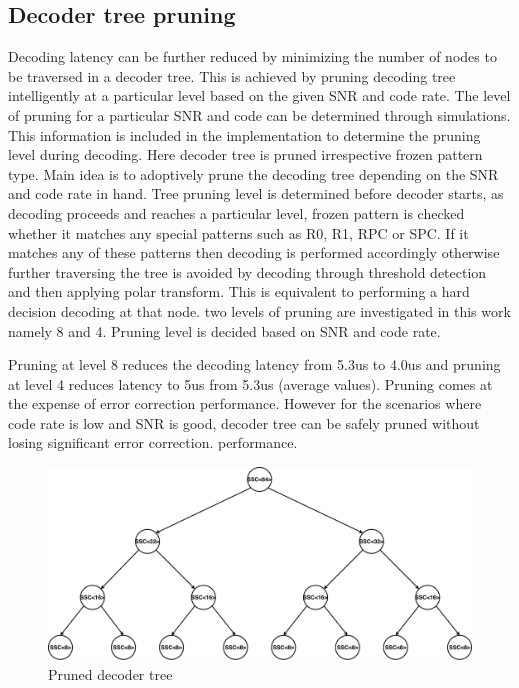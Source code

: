 \subsection{Decoder tree pruning}
Decoding latency can be further reduced by minimizing the number of nodes to be traversed in a decoder tree. This is achieved by pruning decoding tree intelligently at a particular level based on the given SNR and code rate. The level of pruning for a particular SNR and code can be determined through simulations. This information is included in the implementation to determine the pruning level during decoding. Here decoder tree is pruned irrespective frozen pattern type. Main idea is to adoptively prune the decoding tree depending on the SNR and code rate in hand. Tree pruning level is determined before decoder starts, as decoding proceeds and reaches a particular level, frozen pattern is checked whether it matches any special patterns such as R0, R1, RPC or SPC. If it matches any of these patterns then decoding is performed accordingly otherwise further traversing the tree is avoided by decoding through threshold detection and then applying polar transform. This is equivalent to performing a hard decision decoding at that node. two levels of pruning are investigated in this work namely 8 and 4. Pruning level is decided based on SNR and code rate.

Pruning at level 8 reduces the decoding latency from 5.3us to 4.0us and pruning at level 4 reduces latency to 5us from 5.3us (average values). Pruning comes at the expense of error correction performance. However for the scenarios where code rate is low and SNR is good, decoder tree can be safely pruned without losing significant error correction. performance.


\begin{figure}[]
	\centering
	\includegraphics[width=1\textwidth]{./figures/prunedDecoderTree.pdf}
	\caption{Pruned decoder tree}
	\label{fig:prunedDecoderTree}
\end{figure}

